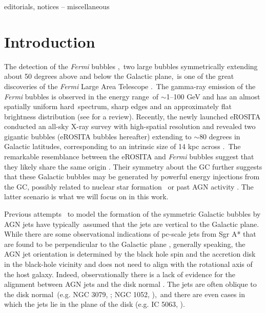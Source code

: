 \documentclass[fleqn,usenatbib,useAMS]{mnras}
\begin{document}
\begin{keywords}
editorials, notices -- miscellaneous
\end{keywords}



\begingroup
\let\clearpage\relax
\endgroup
\newpage



\section{Introduction}
The detection of the \textit{Fermi} bubbles \citep{Su2012,Ackermann2014,Narayanan2017},\
two large bubbles symmetrically extending about 50 degrees above and below the Galactic plane,\
is one of the great discoveries of the \textit{Fermi} Large Area Telescope \citep{Atwood2009}.\
The gamma-ray emission of the \textit{Fermi} bubbles is observed in the energy range\
of $\sim$1--100 GeV and has an almost spatially uniform hard\
spectrum, sharp edges and an approximately flat brightness distribution (see \citealt{Yang2018} for a review). Recently, the newly launched eROSITA \citep{Predehl2021} conducted an all-sky X-ray survey with high-spatial resolution and revealed two gigantic bubbles (eROSITA bubbles hereafter) extending to $\sim 80$ degrees in Galactic latitudes, corresponding to an intrinsic size of 14 kpc across \citep{Predehl2020}.\
The remarkable resemblance between the eROSITA and \textit{Fermi} bubbles suggest that they likely share the same origin \citep{Yang2022}.
Their symmetry about the GC further suggests that these Galactic bubbles may be generated by powerful energy injections from the GC, possibly related to nuclear star formation\
\citep{PhysRevLett.106.101102,Carretti2013,Crocker2015,Sarkar2015}
or past AGN activity \citep{Guo2012,Guo2012b,Yang2012,Yang2013,Mou2014,Yang2017}. The latter scenario is what we will focus on in this work.

Previous attempts \citep{Guo2012,Yang2012,Zhang2020}\
to model the formation of the symmetric Galactic bubbles by AGN jets have typically\
assumed that the jets are vertical to the Galactic plane. While there are some observational indications of pc-scale jets from Sgr A* that are found to be perpendicular to the Galactic plane \citep{Li, Zhu}, generally speaking, the AGN jet orientation is determined by the black hole spin and the accretion disk in the black-hole vicinity and does not need to align with the rotational axis of the host galaxy. Indeed, observationally there is a lack of evidence for the alignment between AGN jets and the disk normal \citep[e.g.,][]{Gallimore2006}. The jets are often oblique to the disk normal\
(e.g. NGC 3079, \citealt{Cecil2001}; NGC 1052, \citealt{Dopita2015}),\
and there are even cases in which the jets lie in the plane of the disk (e.g. IC 5063, \citealt{Morganti2015}).\
\end{document}
